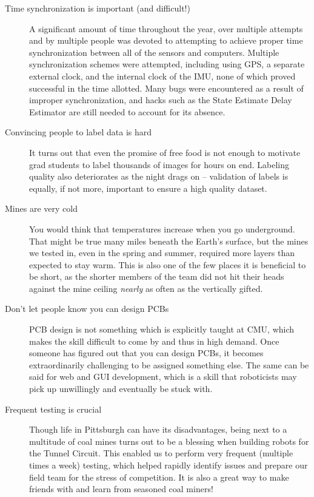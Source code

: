 \begin{description}
	\item[Time synchronization is important (and difficult!)] A significant amount of time throughout the year, over multiple attempts and by multiple people was devoted to attempting to achieve proper time synchronization between all of the sensors and computers. Multiple synchronization schemes were attempted, including using GPS, a separate external clock, and the internal clock of the IMU, none of which proved successful in the time allotted. Many bugs were encountered as a result of improper synchronization, and hacks such as the State Estimate Delay Estimator are still needed to account for its absence.
	\item[Convincing people to label data is hard] It turns out that even the promise of free food is not enough to motivate grad students to label thousands of images for hours on end. Labeling quality also deteriorates as the night drags on -- validation of labels is equally, if not more, important to ensure a high quality dataset.
	\item[Mines are very cold] You would think that temperatures increase when you go underground. That might be true many miles beneath the Earth's surface, but the mines we tested in, even in the spring and summer, required more layers than expected to stay warm. This is also one of the few places it is beneficial to be short, as the shorter members of the team did not hit their heads against the mine ceiling \textit{nearly} as often as the vertically gifted.
	\item[Don't let people know you can design PCBs] PCB design is not something which is explicitly taught at CMU, which makes the skill difficult to come by and thus in high demand. Once someone has figured out that you can design PCBs, it becomes extraordinarily challenging to be assigned something else. The same can be said for web and GUI development, which is a skill that roboticists may pick up unwillingly and eventually be stuck with.
	\item[Frequent testing is crucial] Though life in Pittsburgh can have its disadvantages, being next to a multitude of coal mines turns out to be a blessing when building robots for the Tunnel Circuit. This enabled us to perform very frequent (multiple times a week) testing, which helped rapidly identify issues and prepare our field team for the stress of competition. It is also a great way to make friends with and learn from seasoned coal miners!
\end{description}